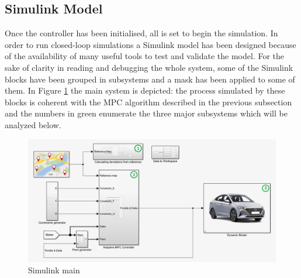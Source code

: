 \subsection{Simulink Model}

Once the controller has been initialised, all is set to begin the simulation.
In order to run closed-loop simulations a Simulink model has been designed because of the availability of many useful tools to test and validate the model. For the sake of clarity in reading and debugging the whole system, some of the Simulink blocks have been grouped in subsystems and a mask has been applied to some of them. 
In Figure \ref{fig:simulink_main_mod} the main system is depicted: the process simulated by these blocks is coherent with the MPC algorithm described in the previous subsection and the numbers in green enumerate the three major subsystems which will be analyzed below.

\begin{figure}[H]
    \centering
    \includegraphics[width=\textwidth]{Figures/simulink_main_mod.png}
    \caption{Simulink main}
    \label{fig:simulink_main_mod}
\end{figure} 


